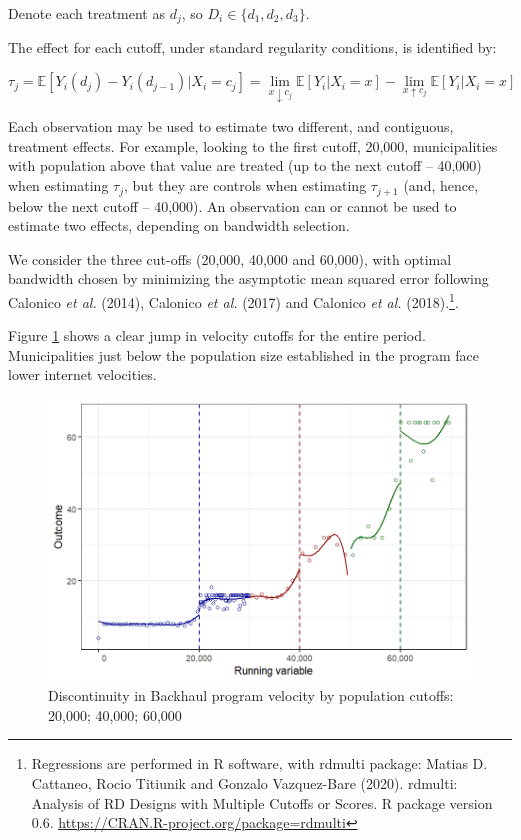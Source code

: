 \documentclass[
  12pt,
]{article}
\begin{document}
Denote each treatment as \(d_j\), so \(D_i \in \{d_1,d_2,d_3\}\).

The effect for each cutoff, under standard regularity conditions, is
identified by:

\begin{equation}
\tau_j= \mathbb{E}[Y_i(d_j) - Y_i(d_{j-1})|X_i=c_j]= \lim\limits_{x \downarrow c_j}\mathbb{E}[Y_i|X_i=x]-\lim\limits_{x \uparrow c_j}\mathbb{E}[Y_i|X_i=x]
\label{eq:001}
\end{equation}

Each observation may be used to estimate two different, and contiguous,
treatment effects. For example, looking to the first cutoff, 20,000,
municipalities with population above that value are treated (up to the
next cutoff -- 40,000) when estimating \(\tau_j\), but they are controls
when estimating \(\tau_{j+1}\) (and, hence, below the next cutoff --
40,000). An observation can or cannot be used to estimate two effects,
depending on bandwidth selection.

We consider the three cut-offs (20,000, 40,000 and 60,000), with optimal
bandwidth chosen by minimizing the asymptotic mean squared error
following Calonico \emph{et al.} (2014), Calonico \emph{et al.} (2017)
and Calonico \emph{et al.} (2018).\footnote{Regressions are performed in
  R software, with rdmulti package: Matias D. Cattaneo, Rocio Titiunik
  and Gonzalo Vazquez-Bare (2020). rdmulti: Analysis of RD Designs with
  Multiple Cutoffs or Scores. R package version 0.6.
  \url{https://CRAN.R-project.org/package=rdmulti}}.

Figure \ref{fig:2} shows a clear jump in velocity cutoffs for the entire
period. Municipalities just below the population size established in the
program face lower internet velocities.

\begin{figure}
\centering
\includegraphics{artigo1_files/figure-latex/discontinuity-1.png}
\caption{Discontinuity in Backhaul program velocity by population
cutoffs: 20,000; 40,000; 60,000 \label{fig:2}}
\end{figure}
\end{document}

